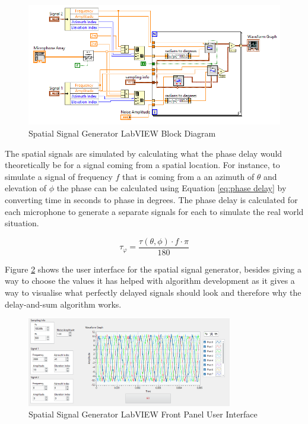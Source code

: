 \documentclass{UoNMCHA}
\numberwithin{equation}{section}
\begin{document}
    \begin{figure}[H]
        \centering
        \includegraphics[keepaspectratio, width = \textwidth]{Figures/SignalGenBlock.png}
        \caption{Spatial Signal Generator LabVIEW Block Diagram}
        \label{fig:SignalGenBlock}
    \end{figure}    
    
    The spatial signals are simulated by calculating what the phase delay would theoretically be for a signal coming from a spatial location. For instance, to simulate a signal of frequency $f$ that is coming from a an azimuth of $\theta$ and elevation of $\phi$ the phase can be calculated using Equation \ref{eq:phase delay} by converting time in seconds to phase in degrees. The phase delay is calculated for each microphone to generate a separate signals for each to simulate the real world situation.
    
    \begin{equation}
        \tau_{\varphi} = \frac{\tau(\theta,\phi) \cdot f \cdot \pi}{180}
        \label{eq:phase delay}
    \end{equation}
    
    Figure \ref{fig:SignalGenPanel} shows the user interface for the spatial signal generator, besides giving a way to choose the values it has helped with algorithm development as it gives a way to visualise what perfectly delayed signals should look and therefore why the delay-and-sum algorithm works.
    
    \begin{figure}[H]
        \centering
        \includegraphics[keepaspectratio, width = 0.8\textwidth]{Figures/SignalGenPanel_5ULA50mm.png}
        \caption{Spatial Signal Generator LabVIEW Front Panel User Interface}
        \label{fig:SignalGenPanel}
    \end{figure}    
\end{document}
